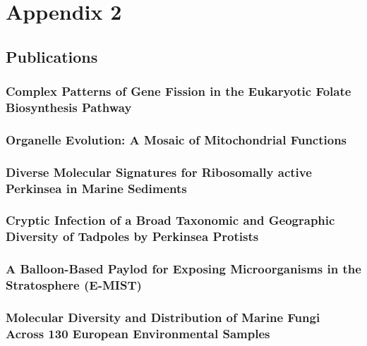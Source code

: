 \graphicspath{{appendices/appendix_2/figures/}}
\chapter{Appendix 2}

\section{Publications}
\subsection{Complex Patterns of Gene Fission in the Eukaryotic Folate Biosynthesis Pathway}
\noindent
\subsection{Organelle Evolution: A Mosaic of Mitochondrial Functions}
\noindent
\subsection{Diverse Molecular Signatures for Ribosomally active Perkinsea in Marine Sediments}
\noindent
\subsection{Cryptic Infection of a Broad Taxonomic and Geographic Diversity of Tadpoles by Perkinsea Protists}
\noindent
\subsection{A Balloon-Based Paylod for Exposing Microorganisms in the Stratosphere (E-MIST)}
\noindent
\subsection{Molecular Diversity and Distribution of Marine Fungi Across 130 European Environmental Samples}
\noindent
%

